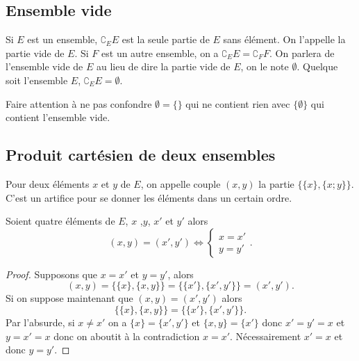\subsection{Ensemble vide}
\label{chap3-subsec:ensemblevide}

Si \(E\) est un ensemble, \(\complement_E E\) est la seule partie de \(E\) sans 
élément. On l'appelle la partie vide de \(E\). Si \(F\) est un autre ensemble, 
on a \(\complement_E E = \complement_F F\). On parlera de l'ensemble vide de 
\(E\) au lieu de dire la partie vide de \(E\), on le note \(\emptyset\). Quelque 
soit l'ensemble \(E\), \(\complement_E E =\emptyset\).

Faire attention à ne pas confondre \(\emptyset = \{\}\) qui ne contient rien 
avec \(\{\emptyset\}\) qui contient l'ensemble vide.

\subsection{Produit cartésien de deux ensembles}
\label{chap3-subsec:prodcart}

\begin{defdef}
    Pour deux éléments \(x\) et \(y\) de \(E\), on appelle couple \((x,y)\) la 
    partie \(\{\{x\},\{x;y\}\}\). C'est un artifice pour se donner les éléments dans 
    un certain ordre.
\end{defdef}

\begin{prop}
    Soient quatre éléments de \(E\), \(x\) ,\(y\), \(x'\) et \(y'\) alors 
    \begin{equation} 
        (x,y)=(x',y') \iff \begin{cases} x=x' \\ y=y' \end{cases}.
    \end{equation}
\end{prop}

\begin{proof}
    Supposons que \(x=x'\) et \(y=y'\), alors 
    \begin{equation}
        (x,y)=\{\{x\},\{x,y\}\}=\{\{x'\},\{x',y'\}\}=(x',y').
    \end{equation}
    Si on suppose maintenant que \((x,y)=(x',y')\) alors 
    \begin{equation}
        \{\{x\},\{x,y\}\}=\{\{x'\},\{x',y'\}\}.
    \end{equation}
    Par l'absurde, si \(x \neq x'\) on a \(\{x\}=\{x',y'\}\) et \(\{x,y\} = \{x'\}\) 
    donc \(x'=y'=x\) et \(y=x'=x\) donc on aboutit à la contradiction \(x=x'\). 
    Nécessairement \(x'=x\) et donc \(y=y'\).
\end{proof}

